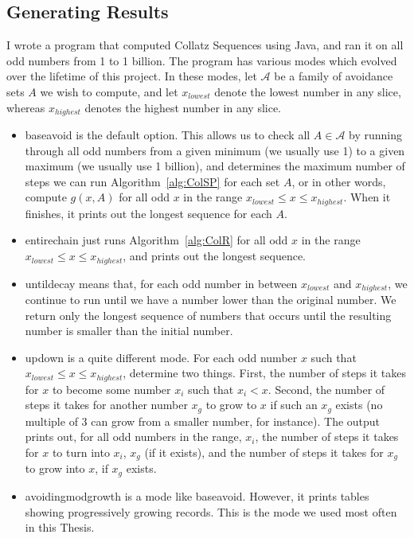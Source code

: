 \documentclass[12pt]{article}
\theoremstyle{definition}
\begin{document}
\subsection{Generating Results} \label{subsec:algcomp}
I wrote a program that computed Collatz Sequences using Java, and ran it on all odd numbers from 1 to 1 billion. The program has various modes which evolved over the lifetime of this project. In these modes, let $\mathcal{A}$ be a family of avoidance sets $A$ we wish to compute, and let $x_{lowest}$ denote the lowest number in any slice, whereas $x_{highest}$ denotes the highest number in any slice.
\begin{itemize}
    \item baseavoid is the default option. This allows us to check all $A \in \mathcal{A}$ by running through all odd numbers from a given minimum (we usually use 1) to a given maximum (we usually use 1 billion), and determines the maximum number of steps we can run Algorithm~\ref{alg:ColSP} for each set $A$, or in other words, compute $g(x,A)$ for all odd $x$ in the range $x_{lowest} \leq x \leq x_{highest}$. When it finishes, it prints out the longest sequence for each $A$.
    \item entirechain just runs Algorithm~\ref{alg:ColR} for all odd $x$ in the range $x_{lowest} \leq x \leq x_{highest}$, and prints out the longest sequence.
    \item untildecay means that, for each odd number in between $x_{lowest}$ and $x_{highest}$, we continue to run until we have a number lower than the original number. We return only the longest sequence of numbers that occurs until the resulting number is smaller than the initial number.
    \item updown is a quite different mode. For each odd number $x$ such that $x_{lowest}\leq x \leq x_{highest}$, determine two things. First, the number of steps it takes for $x$ to become some number $x_i$ such that $x_i < x$. Second, the number of steps it takes for another number $x_g$ to grow to $x$ if such an $x_g$ exists (no multiple of 3 can grow from a smaller number, for instance). The output prints out, for all odd numbers in the range, $x_i$, the number of steps it takes for $x$ to turn into $x_i$, $x_g$ (if it exists), and the number of steps it takes for $x_g$ to grow into $x$, if $x_g$ exists.
    \item avoidingmodgrowth is a mode like baseavoid. However, it prints tables showing progressively growing records. This is the mode we used most often in this Thesis.
\end{itemize}
\end{document}
